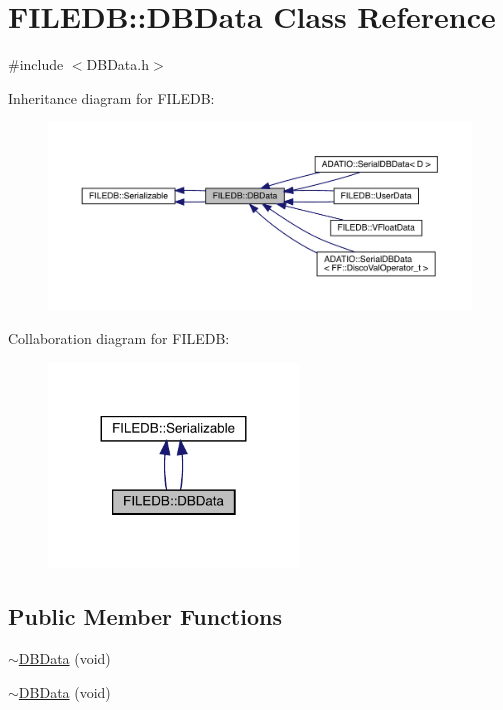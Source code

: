 \hypertarget{classFILEDB_1_1DBData}{}\section{F\+I\+L\+E\+DB\+:\+:D\+B\+Data Class Reference}
\label{classFILEDB_1_1DBData}


{\ttfamily \#include $<$D\+B\+Data.\+h$>$}



Inheritance diagram for F\+I\+L\+E\+DB\+:\nopagebreak
\begin{figure}[H]
\begin{center}
\leavevmode
\includegraphics[width=350pt]{d5/dc8/classFILEDB_1_1DBData__inherit__graph}
\end{center}
\end{figure}


Collaboration diagram for F\+I\+L\+E\+DB\+:\nopagebreak
\begin{figure}[H]
\begin{center}
\leavevmode
\includegraphics[width=188pt]{d9/dde/classFILEDB_1_1DBData__coll__graph}
\end{center}
\end{figure}
\subsection*{Public Member Functions}
\begin{DoxyCompactItemize}
\item 
\mbox{\hyperlink{classFILEDB_1_1DBData_afb154d074a887601e48853bb5b7089b5}{$\sim$\+D\+B\+Data}} (void)
\item 
\mbox{\hyperlink{classFILEDB_1_1DBData_afb154d074a887601e48853bb5b7089b5}{$\sim$\+D\+B\+Data}} (void)
\end{DoxyCompactItemize}

